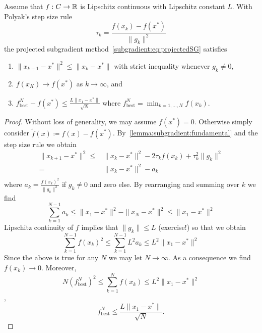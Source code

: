 \begin{theorem}
    Assume that $f:C\rightarrow \mathbb{R}$ is Lipschitz continuous with Lipschitz constant $L$. With Polyak's step size rule 
    \begin{equation}
    \tau_k = \frac{f(x_k)-f(x^*)}{\|g_k\|^2}
\end{equation}
    the projected subgradient method~\eqref{subgradient:eq:projectedSG} satisfies
    \begin{enumerate}
        \item $\|x_{k+1}-x^*\|^2\leq \|x_{k}-x^*\|$ with strict inequality whenever $g_k\neq 0$,
        \item $f(x_K)\rightarrow f(x^*)$ as $k\rightarrow\infty$, and
        \item $f_{\mathrm{best}}^N-f(x^*)\leq \frac{L\|x_1-x^*\|}{\sqrt{N}}$ where $f_{\mathrm{best}}^N = \min_{k=1,\dots,N}f(x_k)$.
    \end{enumerate}
\end{theorem}
\begin{proof}
    Without loss of generality, we may assume $f(x^*)=0$. Otherwise simply consider $\tilde{f}(x) \coloneq f(x)-f(x^*)$. By~\cref{lemma:subgradient:fundamental} and the step size rule we obtain
    \begin{equation}
        \begin{aligned}
            \|x_{k+1}-x^*\|^2 
            \leq& \|x_{k} - x^*\|^2 - 2\tau_k f(x_k) +\tau_k^2\|g_k\|^2\\
            =& \|x_{k} - x^*\|^2 - a_k\\
        \end{aligned}
    \end{equation}
    where $a_k=\frac{f(x_k)^2}{\|g_k\|^2}$ if $g_k\neq 0$ and zero else.
    By rearranging and summing over $k$ we find
    \begin{equation}
        \sum_{k=1}^{N-1} a_k \leq \|x_1-x^*\|^2 - \|x_N-x^*\|^2\leq \|x_1-x^*\|^2
    \end{equation}
    Lipschitz continuity of $f$ implies that $\|g_k\|\leq L$ (exercise!) so that we obtain
    \begin{equation}
        \sum_{k=1}^{N-1} f(x_k)^2\leq \sum_{k=1}^{N-1} L^2 a_k \leq L^2 \|x_1-x^*\|^2
    \end{equation}
    Since the above is true for any $N$ we may let $N\rightarrow \infty$. As a consequence we find $f(x_k)\rightarrow 0$. Moreover,
    \begin{equation}
        N (f_{\mathrm{best}}^N)^2\leq \sum_{k=1}^{N} f(x_k) \leq L^2\|x_1-x^*\|^2
    \end{equation}
    \ie, 
    \begin{equation}
        f_{\mathrm{best}}^N\leq \frac{L\|x_1-x^*\|}{\sqrt{N}}.
    \end{equation}
\end{proof}

